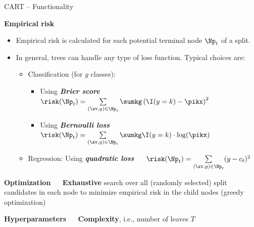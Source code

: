 \documentclass[11pt,compress,t,notes=noshow, xcolor=table]{beamer}
\newcommand{\highlight}[1]{\textcolor{highlightcol}{\textbf{#1}}}
\newcommand{\bfit}[1]{\textbf{\textit{#1}}}
\begin{document}

\begin{frame}{CART -- Functionality}

\footnotesize

\highlight{Empirical risk} \\

\begin{itemize}
  \item Empirical risk is calculated for each potential terminal node $\Np_t$
  of a split.
  \item In general, trees can handle any type of loss function. Typical choices
  are:
  \begin{itemize}
    \footnotesize
    \item Classification (for $g$ classes):
    \begin{itemize}
      \footnotesize
      \item Using \bfit{Brier score} ~~
      $\risk(\Np_t) = \sum\limits_{(\xv,y) \in \Np_t} \sumkg \left( \I(y = k)
      - \pikx \right)^2$
      \item Using \bfit{Bernoulli loss} ~~
      $\risk(\Np_t) = \sum\limits_{(\xv,y) \in \Np_t} \sumkg \I(y = k) \cdot
      \log(\pikx)$
    \end{itemize}
    \item Regression: Using \bfit{quadratic loss} ~~
    $\risk(\Np_t) = \sum\limits_{(\xv,y) \in \Np_t} (y - c_t)^2$
  \end{itemize}
\end{itemize}

\medskip

\highlight{Optimization} ~~ \textbf{Exhaustive} search over
all (randomly selected) split candidates in each node to minimize empirical risk 
in the child nodes (greedy optimization) \\

\medskip

\highlight{Hyperparameters} ~~ \textbf{Complexity}, i.e., 
number of leaves $T$ \\

\normalsize
  
\end{frame}

\end{document}
